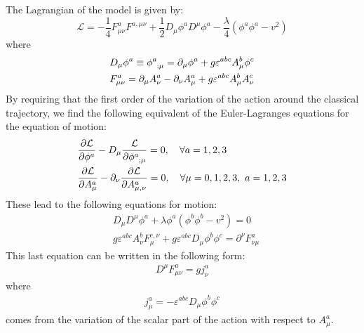 The Lagrangian of the model is given by:
\begin{equation}
  \mathcal{L} = -\frac{1}{4}F_{\mu\nu}^aF^{a,\mu\nu}+\frac{1}{2}D_{\mu}\phi^aD^{\mu}\phi^a-\frac{\lambda}{4}\left(\phi^a\phi^a-v^2\right)\label{eq:GGlagrangian}
\end{equation}
where
\begin{align}
  &D_\mu \phi^a\equiv \phi^a_{\hphantom{a};\mu} = \partial_\mu\phi^a+g\varepsilon^{abc}A_\mu^b\phi^c\\
  &F_{\mu\nu}^a = \partial_\mu A_\nu^a-\partial_\nu A_\mu^a+g\varepsilon^{abc} A_{\mu}^bA_\nu^c
\end{align}
By requiring that the first order of the variation of the action
around the classical trajectory, we find the following equivalent of
the Euler-Lagranges equations for the equation of motion:
\begin{align}
  &\frac{\partial \mathcal{L}}{\partial \phi^a} - D_{\mu}\frac{\mathcal{L}}{\partial \phi^a_{\hphantom{a};\mu}} = 0,\quad \forall a = 1,2,3\\
  &\frac{\partial\mathcal{L}}{\partial A_{\mu}^a}-\partial_{\nu}\frac{\partial \mathcal{L}}{\partial A_{\mu,\nu}^a} = 0,\quad \forall \mu=0,1,2,3,\ a = 1,2,3
\end{align}
These lead to the following equations for motion:
\begin{align}
  &D_{\mu}D^\mu \phi^a +\lambda\phi^a\left(\phi^b\phi^b-v^2\right) = 0\label{eq:motion1}\\
  &g\varepsilon^{abc}A_{\nu}^{b}F_{\mu}^{c,\nu}+g\varepsilon^{abc}D_{\mu}\phi^b\phi^c = \partial^\nu F_{\nu\mu}^a\label{eq:motion2}
\end{align}
This last equation can be written in the following form:
\begin{align}
  D^{\mu}F_{\mu\nu}^a = gj_{\nu}^a
\end{align}
where
\begin{align}
  j_{\mu}^a = -\varepsilon^{abc}D_{\mu}\phi^b\phi^c
\end{align}
comes from the variation of the scalar part of the action with
respect to $A_{\mu}^a$.

